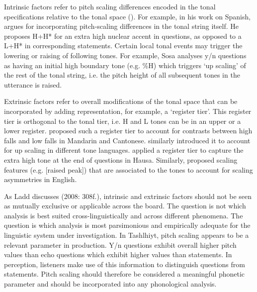 Intrinsic factors refer to pitch scaling differences encoded in the tonal specifications relative to the tonal space (\citealt{BeckmanPierr1986,Sosa1999}). For example, in his work on Spanish, \citet{Sosa1999} argues for incorporating pitch-scaling differences in the tonal string itself. He proposes H+H* for an extra high nuclear accent in questions, as opposed to a L+H* in corresponding statements. Certain local tonal events may trigger the lowering or raising of following tones. For example, Sosa analyses y/n questions as having an initial high boundary tone (e.g. \%H) which triggers ‘up scaling’ of the rest of the tonal string, i.e. the pitch height of all subsequent tones in the utterance is raised. 

Extrinsic factors refer to overall modifications of the tonal space that can be incorporated by adding representation, for example, a ‘register tier’. This register tier is orthogonal to the tonal tier, i.e. H and L tones can be in an upper or a lower register. \citet{Yip1989} proposed such a register tier to account for contrasts between high falls and low falls in Mandarin and Cantonese. \citet{Snider1999} similarly introduced it to account for up scaling in different tone languages. \citet{InkelasLeben1990} applied a register tier to capture the extra high tone at the end of questions in Hausa. Similarly, \citet{Ladd1983} proposed scaling features (e.g. [raised peak]) that are associated to the tones to account for scaling asymmetries in English. 

As Ladd discusses (2008: 308f.), intrinsic and extrinsic factors should not be seen as mutually exclusive or applicable across the board. The question is not which analysis is best suited cross-linguistically and across different phenomena. The question is which analysis is most parsimonious and empirically adequate for the linguistic system under investigation. In Tashlhiyt, pitch scaling appears to be a relevant parameter in production. Y/n questions exhibit overall higher pitch values than echo questions which exhibit higher values than statements. In perception, listeners make use of this information to distinguish questions from statements. Pitch scaling should therefore be considered a meaningful phonetic parameter and should be incorporated into any phonological analysis. 

